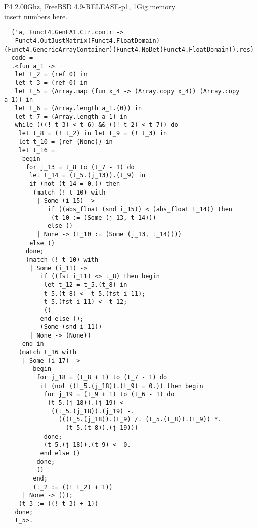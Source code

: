 \documentclass[landscape]{slides}
\begin{document}
\begin{slide}
    P4 2.00Ghz, FreeBSD 4.9-RELEASE-p1, 1Gig memory\\
    insert numbers here.
\end{slide}

\begin{slide}
\begin{small}
\begin{verbatim}
  ('a, Funct4.GenFA1.Ctr.contr ->
   Funct4.OutJustMatrix(Funct4.FloatDomain)(Funct4.GenericArrayContainer)(Funct4.NoDet(Funct4.FloatDomain)).res)
  code =
  .<fun a_1 ->
   let t_2 = (ref 0) in
   let t_3 = (ref 0) in
   let t_5 = (Array.map (fun x_4 -> (Array.copy x_4)) (Array.copy a_1)) in
   let t_6 = (Array.length a_1.(0)) in
   let t_7 = (Array.length a_1) in
   while (((! t_3) < t_6) && ((! t_2) < t_7)) do
    let t_8 = (! t_2) in let t_9 = (! t_3) in
    let t_10 = (ref (None)) in
    let t_16 =
     begin
      for j_13 = t_8 to (t_7 - 1) do
       let t_14 = (t_5.(j_13)).(t_9) in
       if (not (t_14 = 0.)) then
        (match (! t_10) with
         | Some (i_15) ->
            if ((abs_float (snd i_15)) < (abs_float t_14)) then
             (t_10 := (Some (j_13, t_14)))
            else ()
         | None -> (t_10 := (Some (j_13, t_14))))
       else ()
      done;
      (match (! t_10) with
       | Some (i_11) ->
          if ((fst i_11) <> t_8) then begin
           let t_12 = t_5.(t_8) in
           t_5.(t_8) <- t_5.(fst i_11);
           t_5.(fst i_11) <- t_12;
           ()
          end else ();
          (Some (snd i_11))
       | None -> (None))
     end in
    (match t_16 with
     | Some (i_17) ->
        begin
         for j_18 = (t_8 + 1) to (t_7 - 1) do
          if (not ((t_5.(j_18)).(t_9) = 0.)) then begin
           for j_19 = (t_9 + 1) to (t_6 - 1) do
            (t_5.(j_18)).(j_19) <-
             ((t_5.(j_18)).(j_19) -.
               (((t_5.(j_18)).(t_9) /. (t_5.(t_8)).(t_9)) *.
                 (t_5.(t_8)).(j_19)))
           done;
           (t_5.(j_18)).(t_9) <- 0.
          end else ()
         done;
         ()
        end;
        (t_2 := ((! t_2) + 1))
     | None -> ());
    (t_3 := ((! t_3) + 1))
   done;
   t_5>.


\end{verbatim}
\end{small}
\end{slide}
\end{document}
